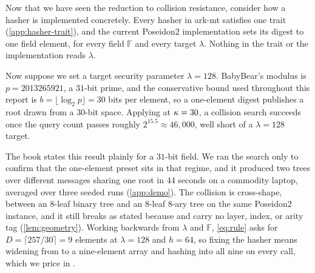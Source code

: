 Now that we have seen the reduction to collision resistance, consider how a hasher is
implemented concretely. Every hasher in \textsf{ark-mt} satisfies one 
trait (\cref{app:hasher-trait}), and the current Poseidon2 implementation sets its digest
to one field element, for every field $\mathbb{F}$ and every target $\lambda$. Nothing in
the trait or the implementation reads $\lambda$.

Now suppose we set a target security parameter $\lambda=128$. BabyBear's modulus is
$p=2013265921$, a $31$-bit prime, and the conservative bound used throughout this report is
$b=\lfloor\log_2 p\rfloor=30$ bits per element, so a one-element digest publishes a root drawn
from a $30$-bit space. Applying  at $\kappa=30$, a collision search
succeeds once the query count passes roughly $2^{15.5}\approx46{,}000$, well short of a
$\lambda=128$ target.

The book states this result plainly for a $31$-bit field. We ran
the search only to confirm that the one-element preset sits in that regime, and it produced two
trees over different messages sharing one root in $44$ seconds on a commodity laptop,
averaged over three seeded runs (\cref{app:demo}). The collision is cross-shape, between an
$8$-leaf binary tree and an $8$-leaf $8$-ary tree on the same Poseidon2 instance, and it
still breaks  as stated because  and
 carry no layer, index, or arity tag (\cref{lem:geometry}). Working
backwards from $\lambda$ and $\mathbb{F}$, \cref{eq:rule} asks for
$D=\lceil257/30\rceil=9$ elements at $\lambda=128$ and $h=64$, so fixing the hasher means
widening  from  to a nine-element array and hashing into all nine on
every call, which we price in .